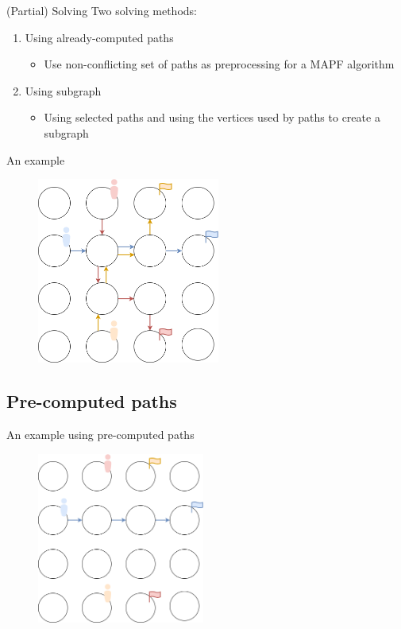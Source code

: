 \begin{frame}{(Partial) Solving}
    Two solving methods:
    \begin{enumerate}
        \item Using already-computed paths
        \begin{itemize}
            \item Use non-conflicting set of paths as preprocessing for a MAPF algorithm 
        \end{itemize}
        \item Using subgraph
        \begin{itemize}
            \item Using selected paths and using the vertices used by paths to create a subgraph  
        \end{itemize}
    \end{enumerate}
\end{frame}



\begin{frame}{An example}
    \begin{figure}[H]
    \centering
    \includegraphics[width=6cm]{img/partial_solving_example.png}
\end{figure}
\end{frame}


\subsection{Pre-computed paths}
\begin{frame}[fragile]{An example using pre-computed paths}
    \begin{figure}[H]
    \centering
    \includegraphics[width=5.5cm]{img/pre_computed_path_solving.drawio.png}
\end{figure}
\end{frame}



